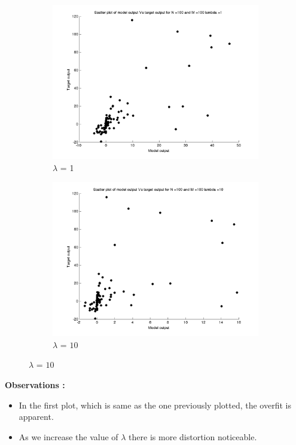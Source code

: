 \documentclass{article}
\begin{document}
\begin{figure}[H]
\begin{subfigure}{.5\textwidth}
\centering
\includegraphics[width=\linewidth]{D2/Scatter/Varyinglambda_N100M100lambda1}
\caption{$\lambda$ = 1}
\end{subfigure}
\begin{subfigure}{.5\textwidth}
\includegraphics[width=\linewidth]{D2/Scatter/Varyinglambda_N100M100lambda10}
\caption{$\lambda$ = $10$}
\end{subfigure}



\end{figure}


\textbf{Observations :}

\begin{itemize}
\item In the first plot, which is same as the one previously plotted, the overfit is apparent.
\item As we increase the value of $\lambda$ there is more distortion noticeable.
\end{itemize}
\end{document}
